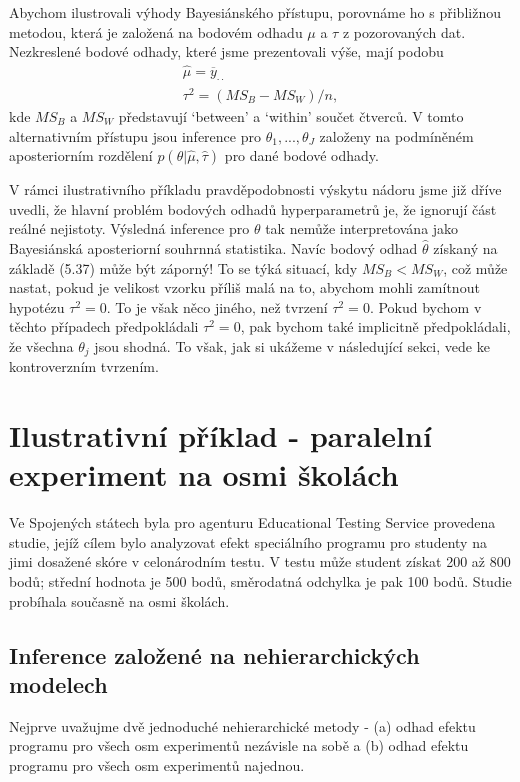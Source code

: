 Abychom ilustrovali výhody Bayesiánského  přístupu, porovnáme ho s přibližnou metodou, která je založená na bodovém odhadu $\mu$ a $\tau$ z pozorovaných dat. Nezkreslené bodové odhady, které jsme prezentovali výše, mají podobu
\begin{equation}
\begin{split}
\hat{\mu} = \overline{y}_{\cdot \cdot}\\
\tau^2 = (MS_B - MS_W)/n,
\end{split}
\end{equation}
kde $MS_B$ a $MS_W$ představují `between' a `within' součet čtverců. V tomto alternativním přístupu jsou inference pro $\theta_1, ..., \theta_J$ založeny na podmíněném aposteriorním rozdělení $p(\theta | \hat{\mu}, \hat{\tau})$ pro dané bodové odhady.

V rámci ilustrativního příkladu pravděpodobnosti výskytu nádoru jsme již dříve uvedli, že hlavní problém bodových odhadů hyperparametrů je, že ignorují část reálné nejistoty. Výsledná inference pro $\theta$ tak nemůže interpretována jako Bayesiánská aposteriorní souhrnná statistika. Navíc bodový odhad $\hat{\theta}$ získaný na základě (5.37) může být záporný! To se týká situací, kdy $MS_B < MS_W$, což může nastat, pokud je velikost vzorku příliš malá na to, abychom mohli zamítnout hypotézu $\tau^2 = 0$. To je však něco jiného, než tvrzení $\tau^2 = 0$. Pokud bychom v těchto případech předpokládali $\tau^2 = 0$, pak bychom také implicitně předpokládali, že všechna $\theta_j$ jsou shodná. To však, jak si ukážeme v následující sekci, vede ke kontroverzním tvrzením.

\section{Ilustrativní příklad - paralelní experiment na osmi školách}

Ve Spojených státech byla pro agenturu Educational Testing Service provedena studie, jejíž cílem bylo analyzovat efekt speciálního programu pro studenty na jimi dosažené skóre v celonárodním testu. V testu může student získat 200 až 800 bodů; střední hodnota je 500 bodů, směrodatná odchylka je pak 100 bodů. Studie probíhala současně na osmi školách.

\subsection{Inference založené na nehierarchických modelech}

Nejprve uvažujme dvě jednoduché nehierarchické metody - (a) odhad efektu programu pro všech osm experimentů nezávisle na sobě a (b) odhad efektu programu pro všech osm experimentů najednou.

